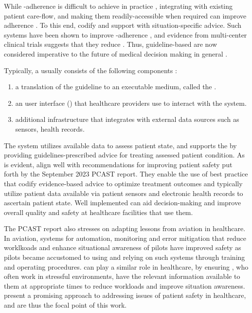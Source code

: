 While \BPG{}-adherence is difficult to achieve in
practice \cite{RandJAMA99,DavisCMAJ97},
integrating \BPGs{} with existing patient care-flow,
and making them readily-accessible when required can improve adherence \cite{WoolfBMJ99}.
To this end, \CDSSs{}
codify \BPGs{} and support \HCPs{} with situation-specific advice.
Such systems have been shown to improve \BPG{}-adherence \cite{GargJAMA06,KawamotoBMJ05}, and evidence from multi-center clinical trials
suggests that they reduce \PMEs{} \cite{BenettJAMIA16,SahotaJIS11}.
Thus, guideline-based \CDSSs{} are now considered imperative to the
future of medical decision making in general \cite{JamesNEJM01}.

Typically, a \CDSS{} usually consists of the following components \cite{SuttonNature20}:
\begin{enumerate}[label=(\alph*)]
  \item a translation of the guideline to an executable medium, called the
  \BPGLogic{}.
\item an user interface (\UI{}) that healthcare providers use to interact with
  the system.
  \item additional infrastructure that integrates with external data sources
  such as sensors, health records.
\end{enumerate}
The system utilizes available data to assess patient state, and
supports the \HCP{} by providing guidelines-prescribed advice for treating
assessed patient condition. As is evident, \CDSSs{} align well with
recommendations for improving patient safety put forth by the September 2023
PCAST report. They enable the use of best practice that codify evidence-based
advice to optimize treatment outcomes and typically utilize patient data
available via patient sensors and electronic health records to ascertain patient
state. Well implemented \CDSSs{} can aid decision-making and improve overall
quality and safety at healthcare facilities that use them.

The PCAST report also stresses on adapting lessons from aviation in healthcare.
In aviation, systems for automation, monitoring and error mitigation that
reduce worklkoads and enhance situational awareness of pilots have
improved safety as pilots became accustomed to using and relying on such
systems through training and operating procedures. \CDSSs{} can play a similar
role in healthcare, by ensuring \HCPs{}, who often work in stressful
environments, have the relevant information available to them at appropriate
times to reduce workloads and improve situation awareness. \CDSSs{}
present a promising approach to addressing issues of patient safety in
healthcare, and are thus the focal point of this work.

